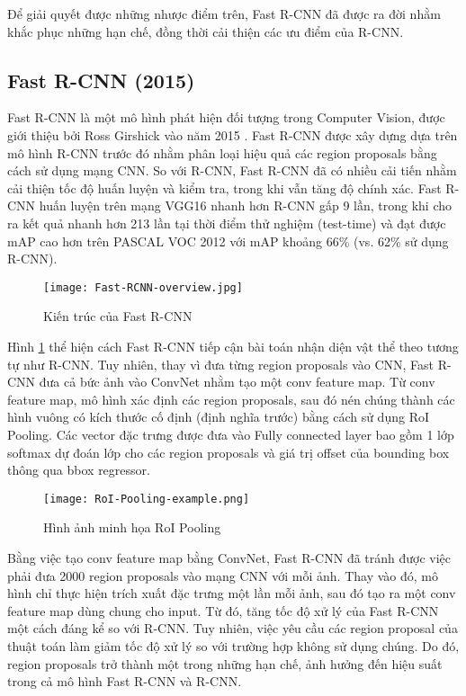 Để giải quyết được những nhược điểm trên, Fast R-CNN \cite{Girshick_2015_ICCV} đã được ra đời nhằm khắc phục những hạn chế, đồng thời cải thiện các ưu điểm của R-CNN.

\subsection{Fast R-CNN (2015)} 
Fast R-CNN là một mô hình phát hiện đối tượng trong Computer Vision, được giới thiệu bởi Ross Girshick vào năm 2015 \citep{Girshick_2015_ICCV}. Fast R-CNN được xây dựng dựa trên mô hình R-CNN trước đó nhằm phân loại hiệu quả các region proposals bằng cách sử dụng mạng CNN. So với R-CNN, Fast R-CNN đã có nhiều cải tiến nhằm cải thiện tốc độ huấn luyện và kiểm tra, trong khi vẫn tăng độ chính xác. Fast R-CNN huấn luyện trên mạng VGG16 nhanh hơn R-CNN gấp 9 lần, trong khi cho ra kết quả nhanh hơn 213 lần tại thời điểm thử nghiệm (test-time) và đạt được mAP cao hơn trên PASCAL VOC 2012 với mAP khoảng 66\% (vs. 62\% sử dụng R-CNN).


\begin{figure}
	\texttt{[image: Fast-RCNN-overview.jpg]}
	\caption{Kiến trúc của Fast R-CNN}
	\label{fig:Fast-RCNN-Architecture}
\end{figure}

Hình \ref{fig:Fast-RCNN-Architecture} thể hiện cách Fast R-CNN tiếp cận bài toán nhận diện vật thể theo tương tự như R-CNN. Tuy nhiên, thay vì đưa từng region proposals vào CNN, Fast R-CNN đưa cả bức ảnh vào ConvNet nhằm tạo một conv feature map. Từ conv feature map, mô hình xác định các region proposals, sau đó nén chúng thành các hình vuông có kích thước cố định (định nghĩa trước) bằng cách sử dụng RoI Pooling. Các vector đặc trưng được đưa vào Fully connected layer bao gồm 1 lớp softmax dự đoán lớp cho các region proposals và giá trị offset của bounding box thông qua bbox regressor. 


\begin{figure}[h]
	\texttt{[image: RoI-Pooling-example.png]}
	\caption{Hình ảnh minh họa RoI Pooling}
\end{figure}

Bằng việc tạo conv feature map bằng ConvNet, Fast R-CNN đã tránh được việc phải đưa 2000 region proposals vào mạng CNN với mỗi ảnh. Thay vào đó, mô hình chỉ thực hiện trích xuất đặc trưng một lần mỗi ảnh, sau đó tạo ra một conv feature map dùng chung cho input. Từ đó, tăng tốc độ xử lý của Fast R-CNN một cách đáng kể so với R-CNN. Tuy nhiên, việc yêu cầu các region proposal của thuật toán làm giảm tốc độ xử lý so với trường hợp không sử dụng chúng. Do đó, region proposals trở thành một trong những hạn chế, ảnh hưởng đến hiệu suất trong cả mô hình Fast R-CNN và R-CNN. 


